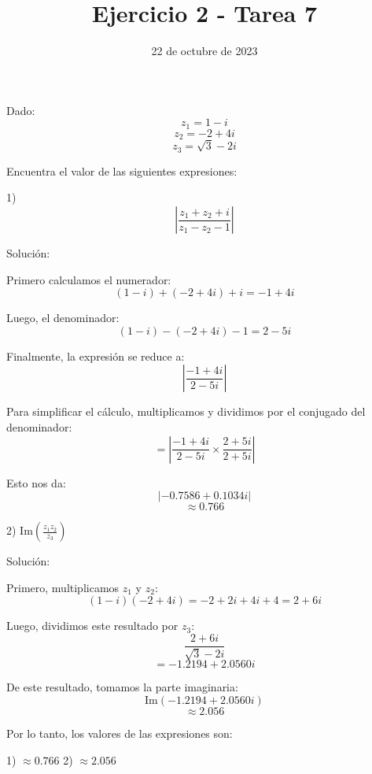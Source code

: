 \documentclass{article}
\title{Ejercicio 2 - Tarea 7}
\date{22 de octubre de 2023}
\begin{document}
\maketitle
Dado:
\[ z_1 = 1 - i \]
\[ z_2 = -2 + 4i \]
\[ z_3 = \sqrt{3} - 2i \]

Encuentra el valor de las siguientes expresiones:

1) \[ \left| \frac{z_1 + z_2 + i}{z_1 - z_2 - 1} \right| \]

Solución:

Primero calculamos el numerador:
\[ (1 - i) + (-2 + 4i) + i = -1 + 4i \]

Luego, el denominador:
\[ (1 - i) - (-2 + 4i) - 1 = 2 - 5i \]

Finalmente, la expresión se reduce a:
\[ \left| \frac{-1 + 4i}{2 - 5i} \right| \]

Para simplificar el cálculo, multiplicamos y dividimos por el conjugado del denominador:
\[ = \left| \frac{-1 + 4i}{2 - 5i} \times \frac{2 + 5i}{2 + 5i} \right| \]

Esto nos da:
\[ \left| -0.7586 + 0.1034i \right| \]
\[ \approx 0.766 \]

2) \( \text{Im}\left( \frac{z_1 z_2}{z_3} \right) \)

Solución:

Primero, multiplicamos \( z_1 \) y \( z_2 \):
\[ (1 - i)(-2 + 4i) = -2 + 2i + 4i + 4 = 2 + 6i \]

Luego, dividimos este resultado por \( z_3 \):
\[ \frac{2 + 6i}{\sqrt{3} - 2i} \]
\[ = -1.2194 + 2.0560i \]

De este resultado, tomamos la parte imaginaria:
\[ \text{Im}\left( -1.2194 + 2.0560i \right) \]
\[ \approx 2.056 \]

Por lo tanto, los valores de las expresiones son:

1) \( \approx 0.766 \)
2) \( \approx 2.056 \)
\end{document}
